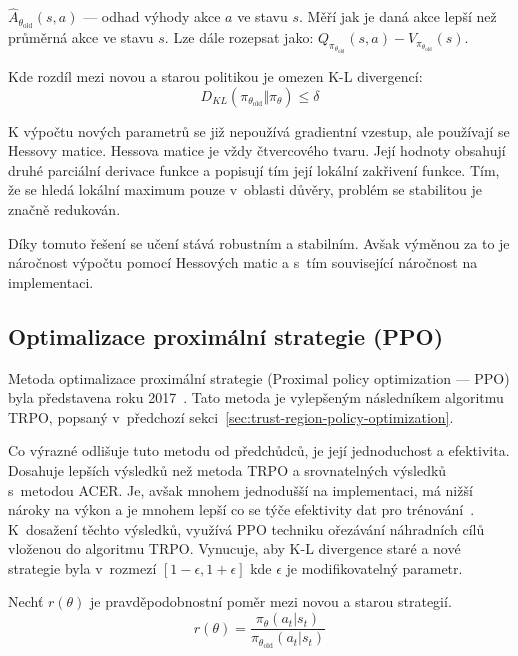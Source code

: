 \begin{myitemize}
  \item $\hat{A}_{\theta_{\text{old}}}(s, a)$ --- odhad výhody akce $a$ ve stavu $s$. Měří jak je daná akce lepší než průměrná akce ve stavu $s$. Lze dále rozepsat jako: $Q_{\pi_{\theta_{\text{old}}}}(s, a) - V_{\pi_{\theta_{\text{old}}}}(s)$.
\end{myitemize}

Kde rozdíl mezi novou a starou politikou je omezen K-L divergencí:
\begin{equation}
  \label{eq:kl_divergence}
    D_{KL}(\pi_{\theta_{\text{old}}} \Vert \pi_{\theta}) \le \delta
\end{equation}

K výpočtu nových parametrů se již nepoužívá gradientní vzestup, ale používají se Hessovy matice.
Hessova matice je vždy čtvercového tvaru.
Její hodnoty obsahují druhé parciální derivace funkce a popisují tím její lokální zakřivení funkce.
Tím, že se hledá lokální maximum pouze v~oblasti důvěry, problém se stabilitou je značně redukován.

Díky tomuto řešení se učení stává robustním a stabilním.
Avšak výměnou za to je náročnost výpočtu pomocí Hessových matic a s~tím související náročnost na implementaci.

\subsection{Optimalizace proximální strategie (PPO)}
\label{sec:proximalni-optimalizace-strategie}

Metoda optimalizace proximální strategie (Proximal policy optimization --- PPO) byla představena roku 2017~\cite{PPO_paper}.
Tato metoda je vylepšeným následníkem algoritmu TRPO, popsaný v~předchozí sekci~\ref{sec:trust-region-policy-optimization}.

Co výrazné odlišuje tuto metodu od předchůdců, je její jednoduchost a efektivita.
Dosahuje lepších výsledků než metoda TRPO a srovnatelných výsledků s~metodou ACER\@.
Je, avšak mnohem jednodušší na implementaci, má nižší nároky na výkon a je mnohem lepší co se týče efektivity dat pro trénování~\cite{PPO_paper}.
K~dosažení těchto výsledků, využívá PPO techniku ořezávání náhradních cílů vloženou do algoritmu TRPO\@.
Vynucuje, aby K-L divergence staré a nové strategie byla v~rozmezí $[1-\epsilon, 1+\epsilon]$ kde $\epsilon$ je modifikovatelný parametr.

\pagebreak

Nechť $r(\theta)$ je pravděpodobnostní poměr mezi novou a starou strategií.
\begin{equation}
  r(\theta) = \frac{\pi_\theta(a_t \vert s_t)}{\pi_{\theta_{\text{old}}}(a_t \vert s_t)}
\end{equation}

